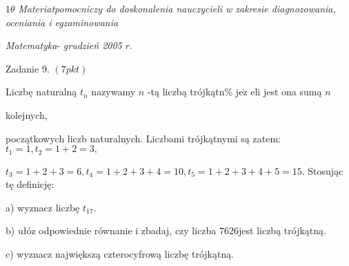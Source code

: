 \documentclass[a4paper,12pt]{article}
\begin{document}
$ 1\theta$ {\it Materiatpomocniczy do doskonalenia nauczycieli w zakresie diagnozowania, oceniania i egzaminowania}

{\it Matematyka}- {\it grudzień 2005} $r.$

Zadanie 9. $(7pkt)$

Liczbę naturalną $t_{n}$ nazywamy $n$ -tą liczbą trójkątn\% $\mathrm{j}\mathrm{e}\dot{\mathrm{z}}$ eli jest ona sumą $n$

kolejnych,

początkowych liczb naturalnych. Liczbami trójkątnymi są zatem: $t_{1}=1, t_{2}=1+2=3,$

$t_{3}=1+2+3=6, t_{4}=1+2+3+4=10, t_{5}=1+2+3+4+5=15$. Stosując tę definicję:

a) wyznacz liczbę $t_{17}.$

b) ułóz odpowiednie równanie i zbadaj, czy liczba $7626$jest liczbą trójkątną.

c) wyznacz największą czterocyfrową liczbę trójkątną.
\end{document}
